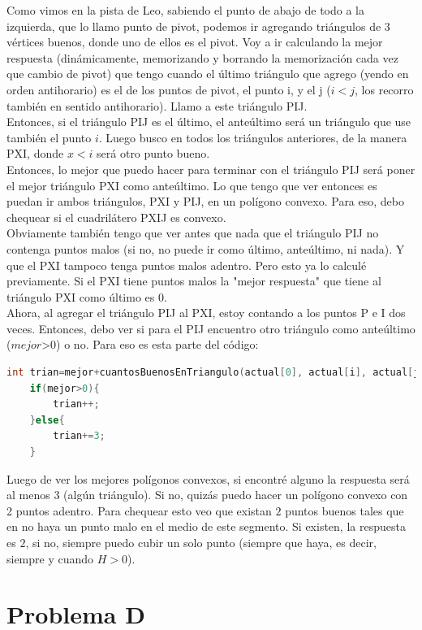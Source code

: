 \documentclass[a4paper]{article}
\begin{document}
Como vimos en la pista de Leo, sabiendo el punto de abajo de todo a la izquierda, que lo llamo punto de pivot, podemos ir agregando triángulos de 3 vértices buenos, donde uno de ellos es el pivot.
Voy a ir calculando la mejor respuesta (dinámicamente, memorizando y borrando la memorización cada vez que cambio de pivot) que tengo cuando el último triángulo que agrego (yendo en orden antihorario) es el de los puntos de pivot, el punto i, y el j ($i<j$, los recorro también en sentido antihorario). Llamo a este triángulo PIJ.
\\
Entonces, si el triángulo PIJ es el último, el anteúltimo será un triángulo que use también el punto $i$. Luego busco en todos los triángulos anteriores, de la manera PXI, donde $x<i$ será otro punto bueno.
\\
Entonces, lo mejor que puedo hacer para terminar con el triángulo PIJ será poner el mejor triángulo PXI como anteúltimo.
Lo que tengo que ver entonces es puedan ir ambos triángulos, PXI y PIJ, en un polígono convexo. Para eso, debo chequear si el cuadrilátero PXIJ es convexo.
\\
Obviamente también tengo que ver antes que nada que el triángulo PIJ no contenga puntos malos (si no, no puede ir como último, anteúltimo, ni nada). Y que el PXI tampoco tenga puntos malos adentro. Pero esto ya lo calculé previamente. Si el PXI tiene puntos malos la "mejor respuesta" que tiene al triángulo PXI como último es 0.
\\
Ahora, al agregar el triángulo PIJ al PXI, estoy contando a los puntos P e I dos veces. Entonces, debo ver si para el PIJ encuentro otro triángulo como anteúltimo ($mejor$>0) o no. Para eso es esta parte del código:
\begin{lstlisting}[language=c++]
int trian=mejor+cuantosBuenosEnTriangulo(actual[0], actual[i], actual[j])-3;
	if(mejor>0){
		trian++;
	}else{
		trian+=3;
	}
\end{lstlisting}

Luego de ver los mejores polígonos convexos, si encontré alguno la respuesta será al menos 3 (algún triángulo).
Si no, quizás puedo hacer un polígono convexo con 2 puntos adentro. Para chequear esto veo que existan $2$ puntos buenos tales que en no haya un punto malo en el medio de este segmento.
Si existen, la respuesta es $2$, si no, siempre puedo cubir un solo punto (siempre que haya, es decir, siempre y cuando $H>0$).

\newpage
\section{Problema D}
\end{document}
